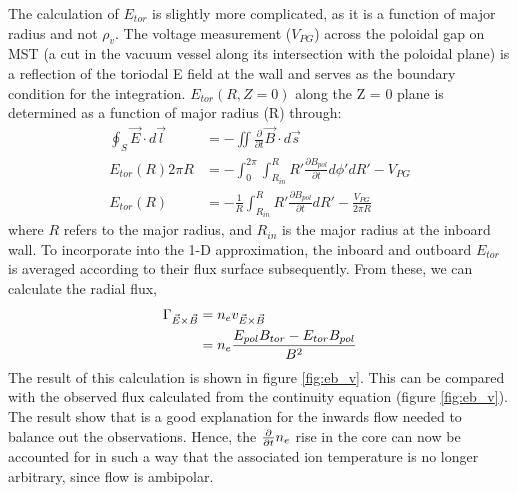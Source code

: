 The calculation of $E_{tor}$ is slightly more complicated, as it is a function of major radius and not $\rho_v$. The voltage measurement ($V_{PG}$) across the poloidal gap on MST (a cut in the vacuum vessel along its intersection with the poloidal plane) is a reflection of the toriodal E field at the wall and serves as the boundary condition for the integration. $E_{tor}(R, Z=0)$ along the Z = 0 plane is determined as a function of major radius (R) through:
\begin{align}
\oint_S \vec{E}\cdot d\vec{l} &= -\iint \frac{\partial}{\partial t}\vec{B}\cdot d\vec{s}\\
E_{tor}(R) 2\pi R &= -\int_0^{2\pi}\int_{R_{in}}^{R}R'\frac{\partial B_{pol}}{\partial t} d\phi'dR' - V_{PG}\\
E_{tor}(R) &= -\frac{1}{R}\int_{R_{in}}^{R}R'\frac{\partial B_{pol}}{\partial t} dR' - \frac{V_{PG}}{2\pi R}\label{eqn:E_tor}
\end{align}
where $R$ refers to the major radius, and $R_{in}$ is the major radius at the inboard wall. To incorporate into the 1-D approximation, the inboard and outboard $E_{tor}$ is averaged according to their flux surface subsequently. From these, we can calculate the radial \ecb flux,
\begin{align}
    \Gamma_{\vec{E} \times \vec{B}} &= n_e v_{\vec{E}\times\vec{B}} \nonumber \\
    &= n_{e} \frac{E_{pol}B_{tor} - E_{tor}B_{pol}}{B^2}
\end{align}
The result of this calculation is shown in figure \ref{fig:eb_v}. This can be compared with the observed flux calculated from the continuity equation (figure \ref{fig:eb_v}). The result show that \ecb is a good explanation for the inwards flow needed to balance out the observations. Hence, the $\frac{\partial}{\partial t} n_e$ rise in the core can now be accounted for in such a way that the associated ion temperature is no longer arbitrary, since \ecb flow is ambipolar.

